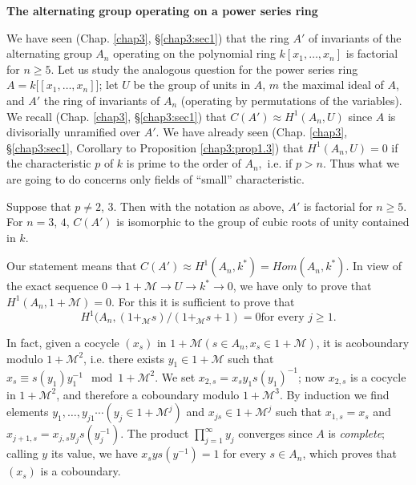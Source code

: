 \begin{center}
\Large{\textbf{The alternating group operating on a power series ring}}
\end{center}\pageoriginale
    
    We have seen (Chap. \ref{chap3}, \S  \ref{chap3:sec1}) that the
    ring $A'$ of invariants 
    of the alternating group $A_n$ operating on the polynomial ring $k
    [x_1, \ldots , x_n]$ is factorial for $n \ge 5$. Let us study the
    analogous question for the power series ring $A = k \big [[x_1,
        \ldots , x_n]\big]$; let $U$ be the group of units in $A$, $m$
    the maximal ideal of $A$, and $A'$ the ring of invariants of $A_n$
    (operating by permutations of the variables). We recall
    (Chap. \ref{chap3}, \S  \ref{chap3:sec1}) that $C(A')
    \approx H^1 (A_n, U)$ since $A$ is 
    divisorially unramified over $A'$.  We have already seen
    (Chap. \ref{chap3}, \S  \ref{chap3:sec1}, Corollary to Proposition
    \ref{chap3:prop1.3}) 
    that $H^1 (A_n 
    , U) = 0$ if the characteristic $p$ of $k$ is prime to the order
    of $A_n, $ i.e. if $p>n$. Thus what we are going to do concerns
    only fields of ``small'' characteristic. 
    
    \begin{theorem*} %
Suppose that  $p \neq 2$, $3$. Then with the notation as above,
  $A'$ is factorial for $n \ge 5$. For $n = 3$, $4$, $C(A')$ is isomorphic
  to the group of cubic roots of unity contained in $k$. 
     \end{theorem*}    
     
     Our statement means that $C(A') \approx H^1 (A_n , k^*) = Hom
     (A_n, k^*)$. In view of the exact sequence $0 \to 1 + \mathscr{M}
     \to U \to k^* \to 0$, we have only to prove that $H^1 (A_n, 1+
     \mathscr{M}) = 0$. For this it is sufficient to prove that 
     \begin{equation*}
H^1 (A_n, (1+_{ \mathscr{M} }s )\big/ (1+_{\mathscr{M}} s+1) = 0 \text{
  for every } j \ge 1. \tag{1}\label{c3:eq1}  
      \end{equation*}      
      
      In fact, given a cocycle $(x_s) $ in $1+ \mathscr{M} (s \in  A_n,
      x_s \in 1+ \mathscr{M})$, it is a\pageoriginale coboundary
      modulo $1+ 
      \mathscr{M}^2$, i.e. there exists $y_1 \in 1+ \mathscr{M}$ such
      that $x_s \equiv s(y_1) y^{-1}_1 \mod 1+ \mathscr{M}^2$. We set
      $x_{2, s} = x_s y_1 s(y_1)^{-1}$; now $x_{2, s}$ is a cocycle
      in $1 +  \mathscr{M}^2$, and therefore a coboundary modulo $1+
      \mathscr{M}^3$. By induction we find elements $y_1, \ldots ,
      y_{j1} \cdots (y_j \in 1+ \mathscr{M}^j)$ and $x_{js} \in 1+
      \mathscr{M}^j$ such that $x_{1, s} = x_s$ and $x_{j +1,s} =
      x_{j,s } y_j s (y^{-1}_j)$. The product $\prod\limits_{j =
        1}^\infty y_j$ converges since $A$ is \textit{complete};
      calling $y$ its value, we have $x_s y s(y^{-1}) = 1$ for every
      $s \in A_n$, which proves that $(x_s)$ is a coboundary. 
      
